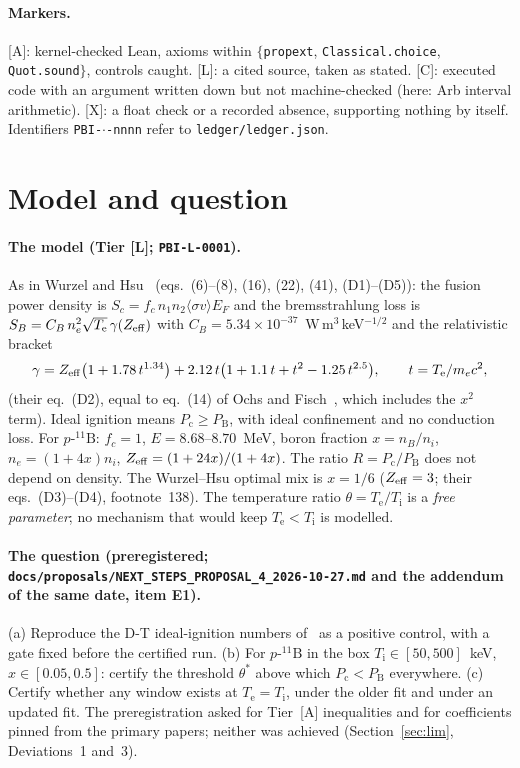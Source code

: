 \documentclass[10pt]{article}
\newcommand{\tier}[1]{\textsf{[#1]}}
\newcommand{\tA}{\tier{A}}
\newcommand{\tL}{\tier{L}}
\newcommand{\tC}{\tier{C}}
\newcommand{\tX}{\tier{X}}
\newcommand{\lean}[1]{\texttt{#1}}
\newcommand{\Te}{T_{\mathrm e}}
\newcommand{\Ti}{T_{\mathrm i}}
\newcommand{\pB}{p\text{-}{}^{11}\mathrm{B}}
\newcommand{\Pc}{P_{\mathrm c}}
\newcommand{\PB}{P_{\mathrm B}}
\begin{document}
\paragraph{Markers.} \tA{}: kernel-checked Lean, axioms within $\{$\lean{propext}, \lean{Classical.choice}, \lean{Quot.sound}$\}$, controls caught. \tL{}: a cited source, taken as stated. \tC{}: executed code with an argument written down but not machine-checked (here: Arb interval arithmetic). \tX{}: a float check or a recorded absence, supporting nothing by itself. Identifiers \texttt{PBI-$\cdot$-nnnn} refer to \texttt{ledger/ledger.json}.

\section{Model and question}\label{sec:model}
\paragraph{The model (Tier \tL{}; \texttt{PBI-L-0001}).} As in Wurzel and Hsu~\cite{wh} (eqs.~(6)--(8), (16), (22), (41), (D1)--(D5)): the fusion power density is $S_c=f_c\,n_1n_2\langle\sigma v\rangle E_F$ and the bremsstrahlung loss is $S_B=C_B\,n_e^2\sqrt{\Te}\,\gamma(Z_{\rm eff})$ with $C_B=5.34\times10^{-37}$~W\,m$^3$\,keV$^{-1/2}$ and the relativistic bracket
$$\gamma=Z_{\rm eff}\bigl(1+1.78\,t^{1.34}\bigr)+2.12\,t\bigl(1+1.1\,t+t^2-1.25\,t^{2.5}\bigr),\qquad t=\Te/m_ec^2,$$
(their eq.~(D2), equal to eq.~(14) of Ochs and Fisch~\cite{of}, which includes the $x^2$ term). Ideal ignition means $\Pc\ge\PB$, with ideal confinement and no conduction loss. For $\pB$: $f_c=1$, $E=8.68$--$8.70$~MeV, boron fraction $x=n_B/n_i$, $n_e=(1+4x)n_i$, $Z_{\rm eff}=(1+24x)/(1+4x)$. The ratio $R=\Pc/\PB$ does not depend on density. The Wurzel--Hsu optimal mix is $x=1/6$ ($Z_{\rm eff}=3$; their eqs.~(D3)--(D4), footnote~138). The temperature ratio $\theta=\Te/\Ti$ is a \emph{free parameter}; no mechanism that would keep $\Te<\Ti$ is modelled.

\paragraph{The question (preregistered; \texttt{docs/proposals/NEXT\_STEPS\_PROPOSAL\_4\_2026-10-27.md} and the addendum of the same date, item E1).} (a) Reproduce the D-T ideal-ignition numbers of~\cite{wh} as a positive control, with a gate fixed before the certified run. (b) For $\pB$ in the box $\Ti\in[50,500]$~keV, $x\in[0.05,0.5]$: certify the threshold $\theta^\ast$ above which $\Pc<\PB$ everywhere. (c) Certify whether any window exists at $\Te=\Ti$, under the older fit and under an updated fit. The preregistration asked for Tier~\tA{} inequalities and for coefficients pinned from the primary papers; neither was achieved (Section~\ref{sec:lim}, Deviations~1 and~3).
\end{document}
